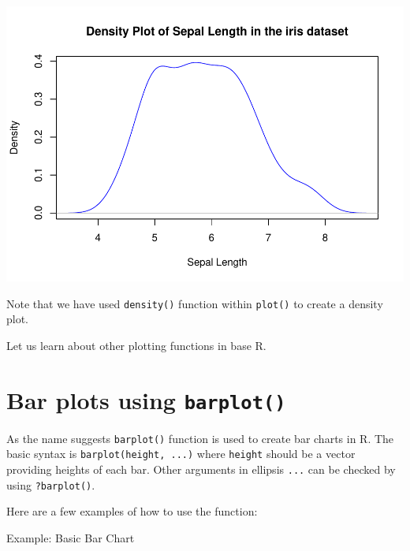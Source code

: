 \documentclass[
]{book}
\newenvironment{Shaded}{\begin{snugshade}}{\end{snugshade}}
\newcommand{\AttributeTok}[1]{\textcolor[rgb]{0.13,0.29,0.53}{#1}}
\newcommand{\CommentTok}[1]{\textcolor[rgb]{0.56,0.35,0.01}{\textit{#1}}}
\newcommand{\FunctionTok}[1]{\textcolor[rgb]{0.13,0.29,0.53}{\textbf{#1}}}
\newcommand{\NormalTok}[1]{#1}
\newcommand{\SpecialCharTok}[1]{\textcolor[rgb]{0.81,0.36,0.00}{\textbf{#1}}}
\newcommand{\StringTok}[1]{\textcolor[rgb]{0.31,0.60,0.02}{#1}}
\begin{document}
\begin{center}\includegraphics[height=0.55\textheight]{DauR_files/figure-latex/p5-1} \end{center}

Note that we have used \texttt{density()} function within \texttt{plot()} to create a density plot.

Let us learn about other plotting functions in base R.

\hypertarget{bar-plots-using-barplot}{%
\section{\texorpdfstring{Bar plots using \texttt{barplot()}}{Bar plots using barplot()}}\label{bar-plots-using-barplot}}

As the name suggests \texttt{barplot()} function is used to create bar charts in R. The basic syntax is \texttt{barplot(height,\ ...)} where \texttt{height} should be a vector providing heights of each bar. Other arguments in ellipsis \texttt{...} can be checked by using \texttt{?barplot()}.

Here are a few examples of how to use the function:

Example: Basic Bar Chart

\begin{Shaded}
\end{Shaded}
\end{document}
